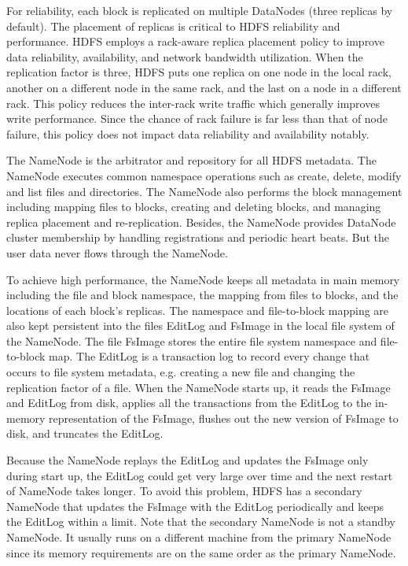 \documentclass[12pt]{book}
\begin{document}
For reliability, each block is replicated on multiple DataNodes (three replicas by default). The placement of replicas is critical to HDFS reliability and performance.  HDFS employs a rack-aware replica placement policy to improve data reliability, availability, and network bandwidth utilization. 
When the replication factor is three, HDFS puts one replica on one node in the local rack, another on a different node in the same rack, and the last on a node in a different rack. This policy reduces the inter-rack write traffic which generally improves write performance. Since the chance of rack failure is far less than that of node failure, this policy does not impact data reliability and availability notably.

The NameNode is the arbitrator and repository for all HDFS metadata. The NameNode executes common namespace operations such as create, delete, modify and list files and directories. The NameNode also performs the block management including mapping files to blocks, creating and deleting blocks, and managing replica placement and re-replication. Besides, the NameNode provides DataNode cluster membership by handling registrations and periodic heart beats. But the user data never flows through the NameNode. 

To achieve high performance, the NameNode keeps all metadata in main memory including the file and block namespace, the mapping from files to blocks, and the locations of each block's replicas. The namespace and file-to-block mapping are also kept persistent into the files EditLog and FsImage in the local file system of the NameNode. The file FsImage stores the entire file system namespace and file-to-block map. The EditLog is a transaction log to record every change that occurs to file system metadata, e.g. creating a new file and changing the replication factor of a file.
When the NameNode starts up, it reads the FsImage and EditLog from disk, applies all the transactions from the EditLog to the in-memory representation of the FsImage, flushes out the new version of FsImage to disk, and truncates the EditLog.
 
Because the NameNode replays the EditLog and updates the FsImage only during start up, the EditLog could get very large over time and the next restart of NameNode takes longer. To avoid this problem, HDFS has a secondary NameNode that updates the FsImage with the EditLog periodically and keeps the EditLog within a limit. Note that the secondary NameNode is not a standby NameNode. It usually runs on a different machine from the primary NameNode since its memory requirements are on the same order as the primary NameNode.
\end{document}
